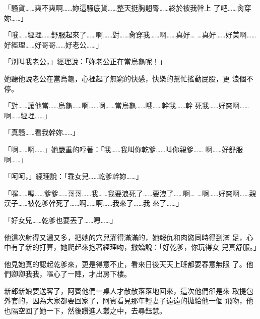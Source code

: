 「騷貨……爽不爽啊……妳這騷底貨……整天挺胸翹臀……終於被我幹上
了吧……肏穿妳……」

「哦……經理……舒服起來了……啊……對……肏穿我……啊……真好…
…真好……好美啊……好經理……好哥哥……好老公……」

「別叫我老公，」經理說：「妳老公正在當烏龜呢！」

她聽他說老公在當烏龜，心裡起了無窮的快感，快樂的幫忙搖動屁股，更
浪個不停。

「對……讓他當……烏龜……啊……啊……當烏龜……哦……幹我……幹
死我……好爽啊……啊……經理……」

「真騷……看我幹妳……」

「啊……啊……」她嚴重的哼著：「我……我叫你乾爹……叫你親爹……
啊……好舒服啊……」

「呵呵，」經理說：「乖女兒……乾爹幹妳……」

「喔……喔……爹爹……哥哥……我……我要浪死了……要洩了……啊…
…啊……好爽啊……親漢子……被乾爹幹死了……啊……啊……我來了……我
來了……」

「好女兒……乾爹也要丟了……嗯……」

他這次射得又濃又多，把她的穴兒灌得滿滿的，她報仇和肉慾同時得到滿
足，心中有了新的打算，她爬起來抱著經理吻，撒嬌說：「好乾爹，你玩得女
兒真舒服。」

他見她真的認起乾爹來，更是得意不止，看來日後天天上班都要春意無限
了。他們卿卿我我，嘔心了一陣，才出房下樓。

新郎新娘要送客了，阿賓他們一桌人才散散落落地回來，這次他們卻是來
取提包外套的，因為大家都要回家了，阿賓看見那年輕妻子遠遠的拋給他一個
飛吻，他也隔空回了她一下，然後躦進人叢之中，去尋鈺慧。










